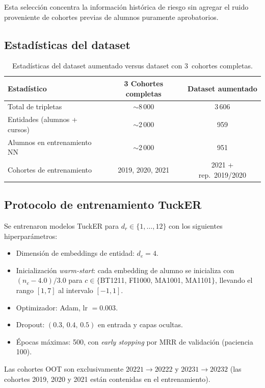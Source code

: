 \documentclass[11pt,a4paper]{article}
\begin{document}
\noindent Esta selección concentra la información histórica de riesgo sin agregar el ruido proveniente de cohortes previas de alumnos puramente aprobatorios.

\subsection{Estadísticas del dataset}

\begin{table}[H]
\centering
\caption{Estadísticas del dataset aumentado versus dataset con 3~cohortes completas.}
\label{tab:stats_dataset}
\begin{tabular}{lcc}
\toprule
\textbf{Estadístico} & \textbf{3 Cohortes completas} & \textbf{Dataset aumentado} \\
\midrule
Total de tripletas & ${\sim}$8\,000 & 3\,606 \\
Entidades (alumnos + cursos) & ${\sim}$2\,000 & 959 \\
Alumnos en entrenamiento NN & ${\sim}$2\,000 & 951 \\
Cohortes de entrenamiento & 2019, 2020, 2021 & 2021 + rep.\ 2019/2020 \\
\bottomrule
\end{tabular}
\end{table}

\subsection{Protocolo de entrenamiento TuckER}

Se entrenaron modelos TuckER para $d_r \in \{1, \ldots, 12\}$ con los siguientes hiperparámetros:

\begin{itemize}
    \item Dimensión de embeddings de entidad: $d_e = 4$.
    \item Inicialización \emph{warm-start}: cada embedding de alumno se inicializa con
    $(n_c - 4.0)/3.0$ para $c \in \{$BT1211, FI1000, MA1001, MA1101$\}$, llevando el
    rango $[1, 7]$ al intervalo $[-1, 1]$.
    \item Optimizador: Adam, lr $= 0.003$.
    \item Dropout: $(0.3,\,0.4,\,0.5)$ en entrada y capas ocultas.
    \item Épocas máximas: 500, con \emph{early stopping} por MRR de validación
    (paciencia 100).
\end{itemize}

Las cohortes OOT son exclusivamente $20221 \to 20222$ y $20231 \to 20232$ (las cohortes
2019, 2020 y 2021 están contenidas en el entrenamiento).
\end{document}
